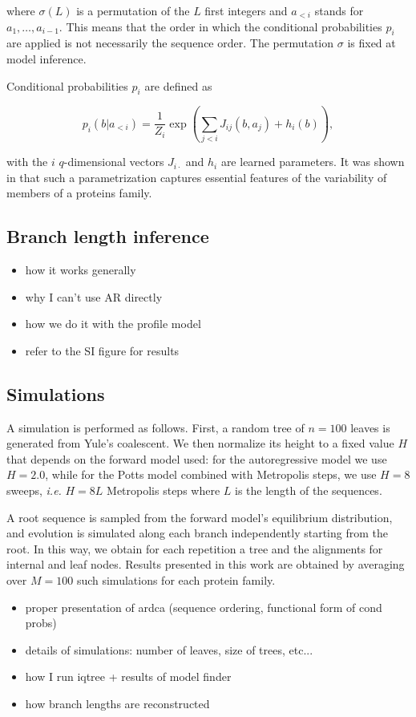 where $\sigma(L)$ is a permutation of the $L$ first integers and $a_{<i}$ stands for $a_1, \ldots, a_{i-1}$. 
This means that the order in which the conditional probabilities $p_i$ are applied is not necessarily the sequence order. 
The permutation $\sigma$ is fixed at model inference. 

Conditional probabilities $p_i$ are defined as

\begin{equation}
	p_i(b \vert a_{<i}) = \frac{1}{Z_i}\exp\left( \sum_{j < i} J_{ij}(b, a_j) + h_i(b) \right),
\end{equation}

with the $i$ $q$-dimensional vectors $J_{i\cdot}$ and $h_i$ are learned parameters. 
It was shown in \cite{trinquier_efficientgenerativemodeling_2021} that such a parametrization captures essential features of the variability of members of a proteins family. 

\subsection{Branch length inference}

\begin{itemize}
	\item how it works generally
	\item why I can't use AR directly
	\item how we do it with the profile model
	\item refer to the SI figure for results
\end{itemize}

\subsection{Simulations}

A simulation is performed as follows. 
First, a random tree of $n=100$ leaves is generated from Yule's coalescent. 
We then normalize its height to a fixed value $H$ that depends on the forward model used: for the autoregressive model we use $H=2.0$, while for the Potts model combined with Metropolis steps, we use $H=8$ sweeps, \emph{i.e.} $H=8 L$ Metropolis steps where $L$ is the length of the sequences. 

A root sequence is sampled from the forward model's equilibrium distribution, and evolution is simulated along each branch independently starting from the root. 
In this way, we obtain for each repetition a tree and the alignments for internal and leaf nodes. 
Results presented in this work are obtained by averaging over $M=100$ such simulations for each protein family. 


\begin{itemize}
	\item proper presentation of ardca (sequence ordering, functional form of cond probs)
	\item details of simulations: number of leaves, size of trees, etc...
	\item how I run iqtree + results of model finder
	\item how branch lengths are reconstructed 
\end{itemize}

